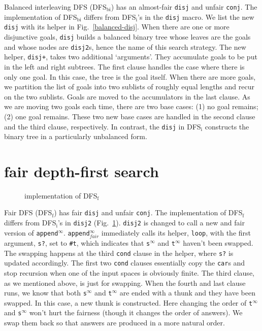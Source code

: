 \documentclass[format=acmlarge, review=true, authordraft=true]{acmart}
\newcommand{\conj}{\texttt{conj}}
\newcommand{\disj}{\texttt{disj}}
\newcommand{\DFSi }[0]{DFS$_\textrm{i}$}
\newcommand{\DFSf }[0]{DFS$_\textrm{f}$}
\begin{document}
Balanced interleaving DFS (DFS$_\textrm{bi}$) has an almost-fair \disj{} and unfair 
\conj{}. The implementation of DFS$_\textrm{bi}$ differs from 
DFS$_\textrm{i}$'s in the \disj{} macro. We list the new \disj{} with its 
helper in Fig.~\ref{balanced-disj}. When there are one or more disjunctive 
goals, \disj{} builds a balanced binary tree whose leaves are the goals and 
whose nodes are \texttt{disj2}s, hence the name of this search strategy. 
The new helper, \texttt{disj+}, takes two additional `arguments'. They 
accumulate goals to be put in the left and right subtrees. The first clause 
handles the case where there is only one goal. In this case, the tree is the 
goal itself. When there are more goals, we partition the list of goals 
into two sublists of roughly equal lengths and recur on the two sublists. Goals 
are moved to the accumulators in the last clause. As we are moving 
two goals each time, there are two base cases: (1) no goal remains; (2) one 
goal remains. These two new base cases are handled in the second clause and the 
third clause, respectively. In contrast, the \disj{} in \DFSi{} constructs the 
binary tree in a particularly unbalanced form.

\section{fair depth-first search}


\begin{figure}
	
	\caption{implementation of \DFSf{}}
	\label{fDFS}
\end{figure}

Fair DFS (\DFSf) has fair \disj{} and unfair \conj{}. The 
implementation of \DFSf{} differs from \DFSi{}'s in 
\texttt{disj2} (Fig.~\ref{fDFS}). \texttt{disj2} is changed to call a new and 
fair version of \texttt{append$^\infty$}. \texttt{append$^\infty_{fair}$} 
immediately 
calls 
its helper, \texttt{loop}, with the first argument, \texttt{s?}, set to 
\texttt{\#{}t}, which indicates that 
\texttt{s$^\infty$} and \texttt{t$^\infty$} haven't been swapped. The swapping 
happens at 
the third \texttt{cond} clause in the helper, where \texttt{s?} is updated 
accordingly. The first two \texttt{cond} clauses essentially copy the 
\texttt{car}s and stop recursion when one of the input spaces is obviously 
finite. The third clause, as we mentioned above, is just for swapping. When the 
fourth and last clause runs, we know that both \texttt{s$^\infty$} and 
\texttt{t$^\infty$} are ended with a thunk and they have been swapped. In this 
case, a new thunk is constructed. Here changing the order of 
\texttt{t$^\infty$} and \texttt{s$^\infty$} won't hurt the fairness (though it 
changes the order of answers). We swap them back so that answers are 
produced in a more natural order.
\end{document}
